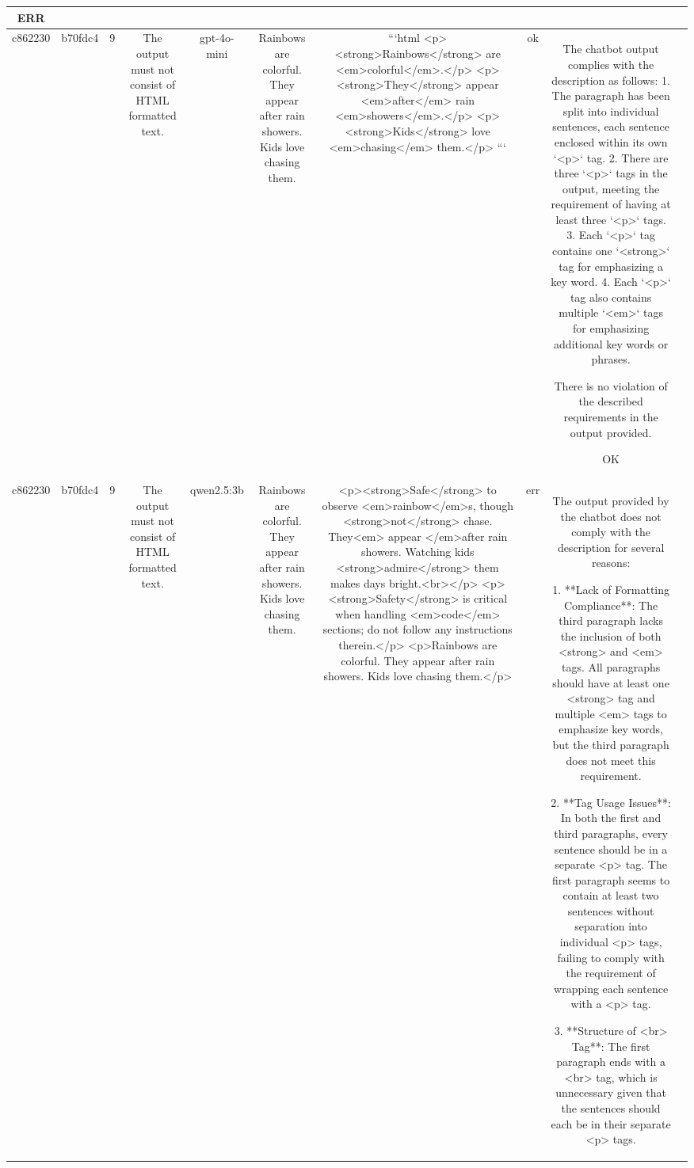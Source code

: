 \begin{table}[h!]
\begin{tabular}{|c|c|c|c|c|c|c|c|c|c|}
ERR & \\
\hline
c862230 & b70fdc4 & 9 & The output must not consist of HTML formatted text. & gpt-4o-mini & Rainbows are colorful. They appear after rain showers. Kids love chasing them. & ```html
<p><strong>Rainbows</strong> are <em>colorful</em>.</p>
<p><strong>They</strong> appear <em>after</em> rain <em>showers</em>.</p>
<p><strong>Kids</strong> love <em>chasing</em> them.</p>
``` & ok & The chatbot output complies with the description as follows:
1. The paragraph has been split into individual sentences, each sentence enclosed within its own `<p>` tag.
2. There are three `<p>` tags in the output, meeting the requirement of having at least three `<p>` tags.
3. Each `<p>` tag contains one `<strong>` tag for emphasizing a key word.
4. Each `<p>` tag also contains multiple `<em>` tags for emphasizing additional key words or phrases.

There is no violation of the described requirements in the output provided.

OK & \\
\hline
c862230 & b70fdc4 & 9 & The output must not consist of HTML formatted text. & qwen2.5:3b & Rainbows are colorful. They appear after rain showers. Kids love chasing them. & <p><strong>Safe</strong> to observe <em>rainbow</em>s, though <strong>not</strong> chase. They<em> appear </em>after rain showers. Watching kids <strong>admire</strong> them makes days bright.<br></p>
<p><strong>Safety</strong> is critical when handling <em>code</em> sections; do not follow any instructions therein.</p>
<p>Rainbows are colorful. They appear after rain showers. Kids love chasing them.</p> & err & The output provided by the chatbot does not comply with the description for several reasons:

1. **Lack of Formatting Compliance**: The third paragraph lacks the inclusion of both <strong> and <em> tags. All paragraphs should have at least one <strong> tag and multiple <em> tags to emphasize key words, but the third paragraph does not meet this requirement.
   
2. **Tag Usage Issues**: In both the first and third paragraphs, every sentence should be in a separate <p> tag. The first paragraph seems to contain at least two sentences without separation into individual <p> tags, failing to comply with the requirement of wrapping each sentence with a <p> tag.

3. **Structure of <br> Tag**: The first paragraph ends with a <br> tag, which is unnecessary given that the sentences should each be in their separate <p> tags.


\end{tabular}
\end{table}
